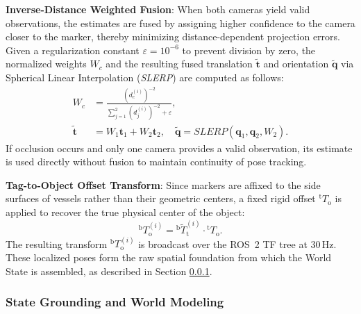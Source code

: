 \documentclass{ieeeaccess}
\begin{document}
\textbf{Inverse-Distance Weighted Fusion}: When both cameras yield valid observations, the estimates are fused by assigning higher confidence to the camera closer to the marker, thereby minimizing distance-dependent projection errors. Given a regularization constant $\varepsilon = 10^{-6}$ to prevent division by zero, the normalized weights $W_c$ and the resulting fused translation $\tilde{\mathbf{t}}$ and orientation $\tilde{\mathbf{q}}$ via Spherical Linear Interpolation (\textit{SLERP}) \cite{lynch2017modern} are computed as follows:
\begin{equation}
\begin{aligned}
    W_c &= \frac{(d_c^{(i)})^{-2}}{\sum_{j=1}^{2} (d_j^{(i)})^{-2} + \varepsilon}, \\
    \tilde{\mathbf{t}} &= W_1\mathbf{t}_1 + W_2\mathbf{t}_2, \quad
    \tilde{\mathbf{q}} = \mathrm{\textit{SLERP}}(\mathbf{q}_1, \mathbf{q}_2, W_2).
\end{aligned}
\end{equation}
If occlusion occurs and only one camera provides a valid observation, its estimate is used directly without fusion to maintain continuity of pose tracking.

\textbf{Tag-to-Object Offset Transform}: Since markers are affixed to the side surfaces of vessels rather than their geometric centers, a fixed rigid offset ${}^{\text{t}}T_{\text{o}}$ is applied to recover the true physical center of the object:
\begin{equation}
    {}^{\text{b}}T_{\text{o}}^{(i)} = {}^{\text{b}}\tilde{T}_{\text{t}}^{(i)} \cdot {}^{\text{t}}T_{\text{o}}.
\end{equation}
The resulting transform ${}^{\text{b}}T_{\text{o}}^{(i)}$ is broadcast over the ROS~2 TF tree at 30\,Hz. These localized poses form the raw spatial foundation from which the World State is assembled, as described in Section \ref{sec:3.3.2}.

\subsubsection{State Grounding and World Modeling}\label{sec:3.3.2}
\end{document}
